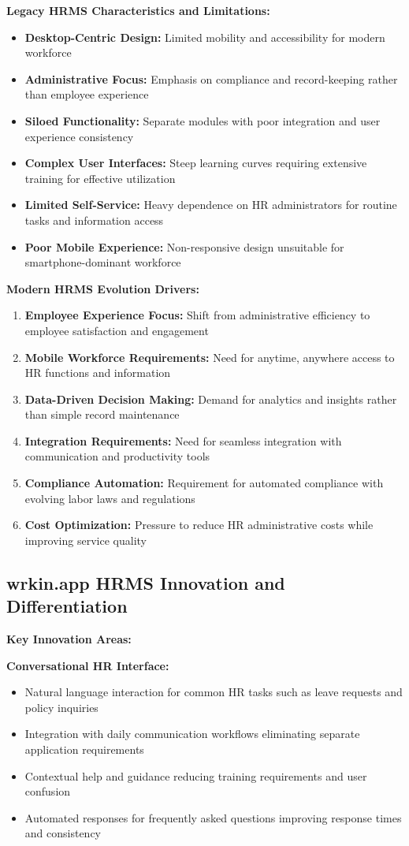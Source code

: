 \textbf{Legacy HRMS Characteristics and Limitations:}
\begin{itemize}
    \item \textbf{Desktop-Centric Design:} Limited mobility and accessibility for modern workforce
    \item \textbf{Administrative Focus:} Emphasis on compliance and record-keeping rather than employee experience
    \item \textbf{Siloed Functionality:} Separate modules with poor integration and user experience consistency
    \item \textbf{Complex User Interfaces:} Steep learning curves requiring extensive training for effective utilization
    \item \textbf{Limited Self-Service:} Heavy dependence on HR administrators for routine tasks and information access
    \item \textbf{Poor Mobile Experience:} Non-responsive design unsuitable for smartphone-dominant workforce
\end{itemize}

\textbf{Modern HRMS Evolution Drivers:}
\begin{enumerate}
    \item \textbf{Employee Experience Focus:} Shift from administrative efficiency to employee satisfaction and engagement
    \item \textbf{Mobile Workforce Requirements:} Need for anytime, anywhere access to HR functions and information
    \item \textbf{Data-Driven Decision Making:} Demand for analytics and insights rather than simple record maintenance
    \item \textbf{Integration Requirements:} Need for seamless integration with communication and productivity tools
    \item \textbf{Compliance Automation:} Requirement for automated compliance with evolving labor laws and regulations
    \item \textbf{Cost Optimization:} Pressure to reduce HR administrative costs while improving service quality
\end{enumerate}

\subsection{wrkin.app HRMS Innovation and Differentiation}

\textbf{Key Innovation Areas:}

\textbf{Conversational HR Interface:}
\begin{itemize}
    \item Natural language interaction for common HR tasks such as leave requests and policy inquiries
    \item Integration with daily communication workflows eliminating separate application requirements
    \item Contextual help and guidance reducing training requirements and user confusion
    \item Automated responses for frequently asked questions improving response times and consistency
\end{itemize}

